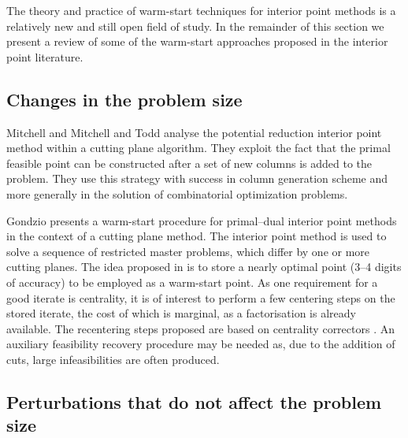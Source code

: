 The theory and practice of warm-start techniques for interior point 
methods is a relatively new and still open field of study.
In the remainder of this section we present a review of some 
of the warm-start approaches proposed in the interior point literature.

%
%
\subsection{Changes in the problem size}

Mitchell \cite{Mitchell88} and Mitchell and Todd \cite{MitchellTodd}
analyse the potential reduction interior point method within
a cutting plane algorithm. They exploit the fact that
the primal feasible point can be constructed after a set of new
columns is added to the problem. They use this strategy with success
in column generation scheme and more generally in the solution 
of combinatorial optimization problems.

Gondzio \cite{Gondzio98} presents a warm-start procedure for 
primal--dual interior point methods in the context of a cutting 
plane method. The interior 
point method is used to solve a sequence of restricted master 
problems, which differ by one or more cutting planes.
%
%
The idea proposed in \cite{Gondzio98} is to store a nearly optimal 
point (3--4 digits of accuracy) to be employed as a warm-start point.
%
%
As one requirement for a good iterate is centrality, it is of interest 
to perform a few centering steps on the stored iterate, the cost of 
which is marginal, as a factorisation is already available. The 
recentering steps proposed are based on
centrality correctors \cite{Gondzio96}.
An auxiliary feasibility recovery procedure may be needed as, due to 
the addition of cuts, large infeasibilities are often produced.


%
%
\subsection{Perturbations that do not affect the problem size}

